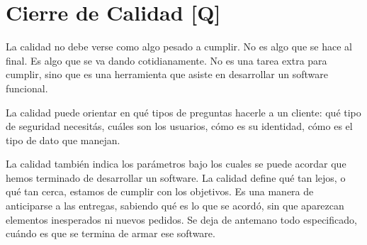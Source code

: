 \hypertarget{cierre-de-calidad-q}{%
\section{Cierre de Calidad {[}Q{]}}\label{cierre-de-calidad-q}}

La calidad no debe verse como algo pesado a cumplir. No es algo que se
hace al final. Es algo que se va dando cotidianamente. No es una tarea
extra para cumplir, sino que es una herramienta que asiste en
desarrollar un software funcional.

La calidad puede orientar en qué tipos de preguntas hacerle a un
cliente: qué tipo de seguridad necesitás, cuáles son los usuarios, cómo
es su identidad, cómo es el tipo de dato que manejan.

La calidad también indica los parámetros bajo los cuales se puede
acordar que hemos terminado de desarrollar un software. La calidad
define qué tan lejos, o qué tan cerca, estamos de cumplir con los
objetivos. Es una manera de anticiparse a las entregas, sabiendo qué es
lo que se acordó, sin que aparezcan elementos inesperados ni nuevos
pedidos. Se deja de antemano todo especificado, cuándo es que se termina
de armar ese software.
